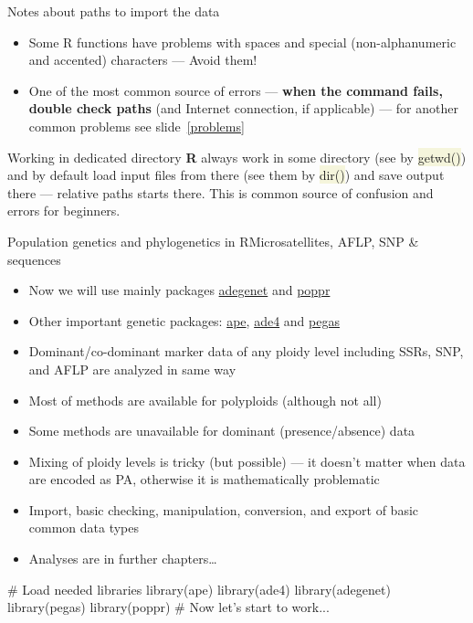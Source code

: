 \documentclass[compress, ucs, xelatex, 11pt, xcolor=svgnames, aspectratio=169,
	hyperref={
		bookmarks=true,
		unicode=true,
		colorlinks=true,
		pdftitle={Molecular data in R},
		plainpages=false,
		pdfauthor={Vojtech Zeisek},
		pdfsubject={Course about phylogeny and evolution in R},
		pdfcreator={XeLaTeX},
		pdfkeywords={R, evolution, phylogeny, molecular data},
		linkcolor=Crimson, %
		anchorcolor=Magenta, %
		citecolor=Magenta, %
		filecolor=Magenta, %
		menucolor=Magenta, %
		urlcolor=DodgerBlue, %
		pdftex},
	url={hyphens, lowtilde} %
	]{beamer}
\renewcommand{\texttt}[1]{\colorbox{Beige}{{\ttfamily #1}}}
\begin{document}
\begin{frame}[allowframebreaks]{Notes about paths to import the data}
\begin{itemize}
\begin{itemize}
		\end{itemize}
		\item Some R functions have problems with spaces and special (non-alphanumeric and accented) characters --- Avoid them!
		\item One of the most common source of errors --- \textbf{when the command fails, double check paths} (and Internet connection, if applicable) --- for another common problems see slide~\ref{problems}
	\end{itemize}
	\begin{alertblock}{Working in dedicated directory}
		\textbf{R} always work in some directory (see by \texttt{getwd()}) and by default load input files from there (see them by \texttt{dir()}) and save output there --- relative paths starts there. This is common source of confusion and errors for beginners.
	\end{alertblock}
\end{frame}

\begin{frame}[fragile]{Population genetics and phylogenetics in R}{Microsatellites, AFLP, SNP \& sequences}
	\begin{multicols}{2}
		\begin{itemize}
			\item Now we will use mainly packages \href{https://adegenet.r-forge.r-project.org/}{adegenet} and \href{https://grunwaldlab.github.io/poppr/}{poppr}
			\item Other important genetic packages: \href{http://ape-package.ird.fr/}{ape}, \href{https://pbil.univ-lyon1.fr/ADE-4/}{ade4} and \href{http://ape-package.ird.fr/pegas.html}{pegas}
			\item Dominant/co-dominant marker data of any ploidy level including SSRs, SNP, and AFLP are analyzed in same way
			\item Most of methods are available for polyploids (although not all)
			\item Some methods are unavailable for dominant (presence/absence) data
			\item Mixing of ploidy levels is tricky (but possible) --- it doesn't matter when data are encoded as PA, otherwise it is mathematically problematic
			\item Import, basic checking, manipulation, conversion, and export of basic common data types
			\item Analyses are in further chapters\ldots
		\end{itemize}
		\begin{spluscode}
    # Load needed libraries
    library(ape)
    library(ade4)
    library(adegenet)
    library(pegas)
    library(poppr)
    # Now let's start to work...
		\end{spluscode}
	\end{multicols}
\end{frame}
\end{document}
